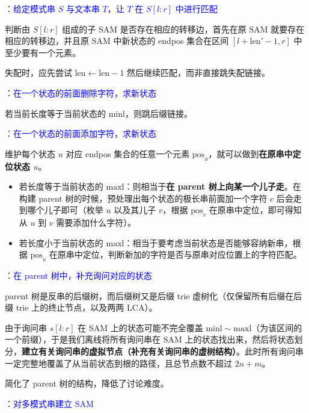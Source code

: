 ：\textcolor{blue}{给定模式串 $S$ 与文本串 $T$，让 $T$ 在 $S[l : r]$ 中进行匹配}

判断由 $S[l : r]$ 组成的子 SAM 是否存在相应的转移边，首先在原 SAM 就要存在相应的转移边，并且原 SAM 中新状态的 endpos 集合在区间 $[l + \mathrm{len}' - 1, r]$ 中至少要有一个元素。

失配时，应先尝试 $\mathrm{len} \gets \mathrm{len} - 1$ 然后继续匹配，而非直接跳失配链接。

：\textcolor{blue}{在一个状态的前面删除字符，求新状态}

若当前长度等于当前状态的 $\mathrm{minl}$，则跳后缀链接。

：\textcolor{blue}{在一个状态的前面添加字符，求新状态}

维护每个状态 $u$ 对应 endpos 集合的任意一个元素 $\mathrm{pos}_u$，就可以做到\textbf{在原串中定位状态 $u$}。

\begin{itemize}
    \item 若长度等于当前状态的 $\mathrm{maxl}$：则相当于\textbf{在 parent 树上向某一个儿子走}。在构建 parent 树的时候，预处理出每个状态的极长串前面加一个字符 $c$ 后会走到哪个儿子即可（枚举 $u$ 以及其儿子 $v$，根据 $\mathrm{pos}_v$ 在原串中定位，即可得知从 $u$ 到 $v$ 需要添加什么字符）。
    \item 若长度小于当前状态的 $\mathrm{maxl}$：相当于要考虑当前状态是否能够容纳新串，根据 $\mathrm{pos}_u$ 在原串中定位，判断新加的字符是否与原串对应位置上的字符匹配。
\end{itemize}


：\textcolor{blue}{在 parent 树中，补充询问对应的状态}

parent 树是反串的后缀树，而后缀树又是后缀 trie 虚树化（仅保留所有后缀在后缀 trie 上的终止节点，以及两两 LCA）。

由于询问串 $s[l : r]$ 在 SAM 上的状态可能不完全覆盖 $\mathrm{minl} \sim \mathrm{maxl}$（为该区间的一个前缀），于是我们离线将所有询问串在 SAM 上的状态找出来，然后将状态划分，\textbf{建立有关询问串的虚拟节点（补充有关询问串的虚树结构）}。此时所有询问串一定完整地覆盖了从当前状态到根的路径，且总节点数不超过 $2n + m$。

简化了 parent 树的结构，降低了讨论难度。

：\textcolor{blue}{对多模式串建立 SAM}


